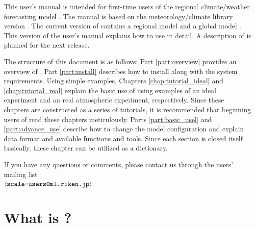 
This user's manual is intended for first-time users
of the regional climate/weather forecasting model \scalerm.
The manual is based on
the meteorology/climate library {\scalelib} version \version.
The current version of \scalelib contains a regional model \scalerm
and a global model \scalegm.
This version of the user's manual explains how to use \scalerm in detail.
A description of \scalegm is planned for the next release.

The structure of this document is as follows:
Part \ref{part:overview} provides an overview of \scalelib,
Part \ref{part:install} describes how to install \scalerm
along with the system requirements. Using simple examples,
Chapters \ref{chap:tutorial_ideal} and \ref{chap:tutorial_real}
explain the basic use of \scalerm
using examples of an ideal experiment and an real atmospheric experiment, respectively.
Since these chapters are constructed as a series of tutorials, it is recommended that beginning users of \scalerm read these chapters meticulously.
Parts \ref{part:basic_usel} and \ref{part:advance_use}
describe how to change the model configuration and explain data format and available functions and tools.
Since each section is closed itself basically, these chapter can be utilized as a dictionary.


If you have any questions or comments, please contact us through the users’ mailing list\\ $\langle \verb|scale-users@ml.riken.jp|\rangle$.


\section{What is \scalelib?} \label{subsec:scale_feature}

